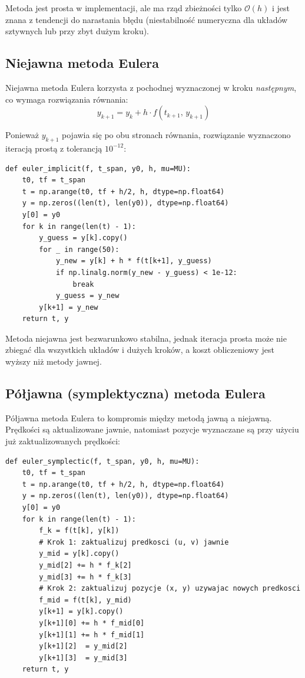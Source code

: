 \documentclass[12pt, a4paper]{article}
\begin{document}
Metoda jest prosta w implementacji, ale ma rząd zbieżności tylko $\mathcal{O}(h)$ i jest znana z tendencji do narastania błędu (niestabilność numeryczna dla układów sztywnych lub przy zbyt dużym kroku).

\subsection{Niejawna metoda Eulera}

Niejawna metoda Eulera korzysta z pochodnej wyznaczonej w kroku \emph{następnym}, co wymaga rozwiązania równania:
\[
  y_{k+1} = y_k + h \cdot f(t_{k+1},\, y_{k+1})
\]

Ponieważ $y_{k+1}$ pojawia się po obu stronach równania, rozwiązanie wyznaczono iteracją prostą z tolerancją $10^{-12}$:

\begin{lstlisting}[caption={Implementacja niejawnej metody Eulera (iteracja prosta)}]
def euler_implicit(f, t_span, y0, h, mu=MU):
    t0, tf = t_span
    t = np.arange(t0, tf + h/2, h, dtype=np.float64)
    y = np.zeros((len(t), len(y0)), dtype=np.float64)
    y[0] = y0
    for k in range(len(t) - 1):
        y_guess = y[k].copy()
        for _ in range(50):
            y_new = y[k] + h * f(t[k+1], y_guess)
            if np.linalg.norm(y_new - y_guess) < 1e-12:
                break
            y_guess = y_new
        y[k+1] = y_new
    return t, y
\end{lstlisting}

Metoda niejawna jest bezwarunkowo stabilna, jednak iteracja prosta może nie zbiegać dla wszystkich układów i dużych kroków, a koszt obliczeniowy jest wyższy niż metody jawnej.

\subsection{Półjawna (symplektyczna) metoda Eulera}

Półjawna metoda Eulera to kompromis między metodą jawną a niejawną. Prędkości są aktualizowane jawnie, natomiast pozycje wyznaczane są przy użyciu już zaktualizowanych prędkości:

\begin{lstlisting}[caption={Implementacja półjawnej (symplektycznej) metody Eulera}]
def euler_symplectic(f, t_span, y0, h, mu=MU):
    t0, tf = t_span
    t = np.arange(t0, tf + h/2, h, dtype=np.float64)
    y = np.zeros((len(t), len(y0)), dtype=np.float64)
    y[0] = y0
    for k in range(len(t) - 1):
        f_k = f(t[k], y[k])
        # Krok 1: zaktualizuj predkosci (u, v) jawnie
        y_mid = y[k].copy()
        y_mid[2] += h * f_k[2]
        y_mid[3] += h * f_k[3]
        # Krok 2: zaktualizuj pozycje (x, y) uzywajac nowych predkosci
        f_mid = f(t[k], y_mid)
        y[k+1] = y[k].copy()
        y[k+1][0] += h * f_mid[0]
        y[k+1][1] += h * f_mid[1]
        y[k+1][2]  = y_mid[2]
        y[k+1][3]  = y_mid[3]
    return t, y
\end{lstlisting}
\end{document}
